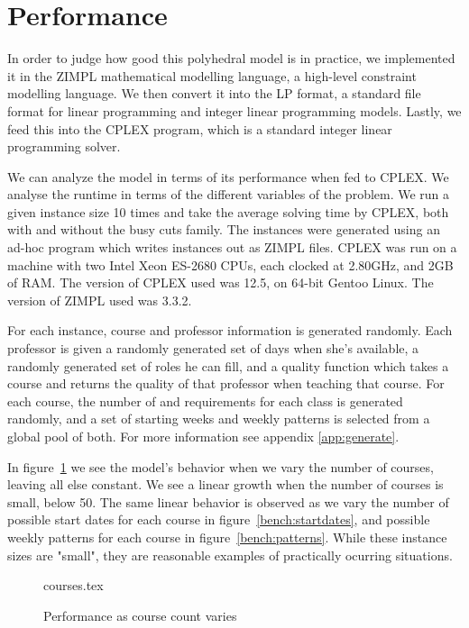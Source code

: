 \newpage
\section{Performance}

In order to judge how good this polyhedral model is in practice, we implemented it in the ZIMPL mathematical modelling language, a high-level constraint modelling language. We then convert it into the LP format, a standard file format for linear programming and integer linear programming models. Lastly, we feed this into the CPLEX program, which is a standard integer linear programming solver.

We can analyze the model in terms of its performance when fed to CPLEX. We analyse the runtime in terms of the different variables of the problem. We run a given instance size 10 times and take the average solving time by CPLEX, both with and without the busy cuts family. The instances were generated using an ad-hoc program which writes instances out as ZIMPL files. CPLEX was run on a machine with two Intel Xeon ES-2680 CPUs, each clocked at 2.80GHz, and 2GB of RAM. The version of CPLEX used was 12.5, on 64-bit Gentoo Linux. The version of ZIMPL used was 3.3.2.

For each instance, course and professor information is generated randomly. Each professor is given a randomly generated set of days when she's available, a randomly generated set of roles he can fill, and a quality function which takes a course and returns the quality of that professor when teaching that course. For each course, the number of and requirements for each class is generated randomly, and a set of starting weeks and weekly patterns is selected from a global pool of both. For more information see appendix \ref{app:generate}.

In figure~\ref{bench:courses} we see the model's behavior when we vary the number of courses, leaving all else constant. We see a linear growth when the number of courses is small, below 50. The same linear behavior is observed as we vary the number of possible start dates for each course in figure~\ref{bench:startdates}, and possible weekly patterns for each course in figure~\ref{bench:patterns}. While these instance sizes are "small", they are reasonable examples of practically ocurring situations.

\begin{figure}[b]
\begin{center}
{courses.tex}
\caption{Performance as course count varies}
\label{bench:courses}
\end{center}
\end{figure}

